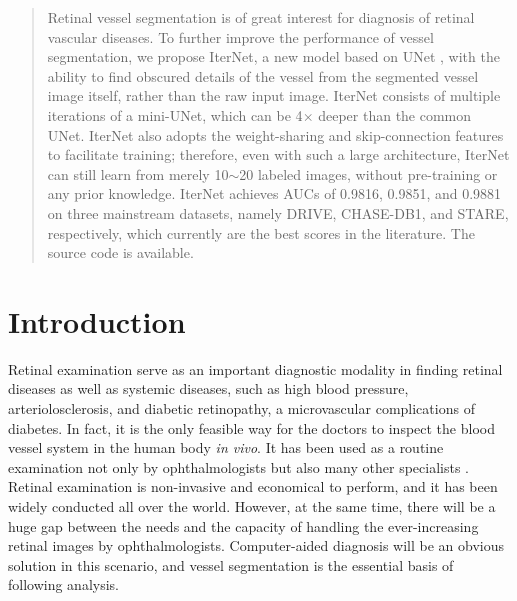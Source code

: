 \documentclass[10pt,twocolumn,letterpaper]{article}
\begin{document}
	\maketitle
	\thispagestyle{plain}


\begin{abstract}
	\vspace{-3.5mm}
 Retinal vessel segmentation is of great interest for diagnosis of retinal vascular diseases. To further improve the performance of vessel segmentation, we propose IterNet, a new model based on UNet \cite{UNet}, with the ability to find obscured details of the vessel from the segmented vessel image itself, rather than the raw input image. IterNet consists of multiple iterations of a mini-UNet, which can be 4$\times$ deeper than the common UNet. IterNet also adopts the weight-sharing and skip-connection features to facilitate training; therefore, even with such a large architecture, IterNet can still learn from merely 10$\sim$20 labeled images, without pre-training or any prior knowledge. IterNet achieves AUCs of 0.9816, 0.9851, and 0.9881 on three mainstream datasets, namely DRIVE, CHASE-DB1, and STARE, respectively, which currently are the best scores in the literature.
The source code is available\footnotemark.
\vspace{-5mm}
\end{abstract}



\section{Introduction}\label{section_intro}
Retinal examination serve as an important diagnostic modality in finding retinal diseases as well as systemic diseases, such as high blood pressure, arteriolosclerosis, and diabetic retinopathy, a microvascular complications of diabetes. In fact, it is the only feasible way for the doctors to inspect the blood vessel system in the human body \textit{in vivo}. It has been used as a routine examination not only by ophthalmologists but also many other specialists \cite{chatziralli2012value}.
Retinal examination is non-invasive and economical to perform, and it has been widely conducted all over the world. However, at the same time, there will be a huge gap between the needs and the capacity of handling the ever-increasing retinal images by ophthalmologists. Computer-aided diagnosis will be an obvious solution in this scenario, and vessel segmentation is the essential basis of following analysis.
\end{document}
